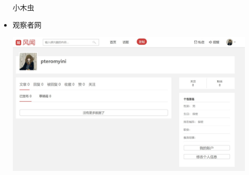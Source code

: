 \documentclass{article}
\begin{document}
\begin{itemize}
	\centerline{小木虫}	
	\par 
	\item 观察者网
	\par
	\centerline{\includegraphics[width=12cm]{guanchazhe}}

\end{itemize}
\hspace*{\fill} \\


\end{document}

